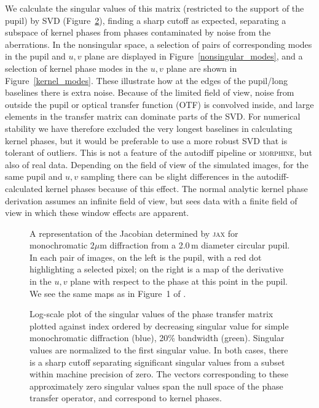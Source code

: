 \documentclass[modern]{aastex63}
\begin{document}
We calculate the singular values of this matrix (restricted to the support of the pupil) by SVD (Figure~\ref{fig:svd}), finding a sharp cutoff as expected, separating a subspace of kernel phases from phases contaminated by noise from the aberrations. In the nonsingular space, a selection of pairs of corresponding modes in the pupil and $u,v$ plane are displayed in Figure~\ref{nonsingular_modes}, and a selection of kernel phase modes in the $u,v$ plane are shown in Figure~\ref{kernel_modes}. These illustrate how at the edges of the pupil/long baselines there is extra noise. Because of the limited field of view, noise from outside the pupil or optical transfer function (OTF) is convolved inside, and large elements in the transfer matrix can dominate parts of the SVD. For numerical stability we have therefore excluded the very longest baselines in calculating kernel phases, but it would be preferable to use a more robust SVD that is tolerant of outliers. This is not a feature of the autodiff pipeline or \textsc{morphine}, but also of real data. Depending on the field of view of the simulated images, for the same pupil and $u,v$ sampling there can be slight differences in the autodiff-calculated kernel phases because of this effect. The normal analytic kernel phase derivation assumes an infinite field of view, but sees data with a finite field of view in which these window effects are apparent. %

\begin{figure}
\caption{A representation of the Jacobian determined by \textsc{jax} for monochromatic 2$\mu$m diffraction from a 2.0\,m diameter circular pupil. In each pair of images, on the left is the pupil, with a red dot highlighting a selected pixel; on the right is a map of the derivative in the $u,v$ plane with respect to the phase at this point in the pupil. We see the same maps as in Figure~1 of \citet{martinache10}. \label{kernel_jacobian}}
\end{figure}

\begin{figure}
     \caption{Log-scale plot of the singular values of the phase transfer matrix plotted against index ordered by decreasing singular value for simple monochromatic diffraction (blue), 20\% bandwidth (green). Singular values are normalized to the first singular value. In both cases, there is a sharp cutoff separating significant singular values from a subset within machine precision of zero. The vectors corresponding to these approximately zero singular values span the null space of the phase transfer operator, and correspond to kernel phases. \href{https://github.com/benjaminpope/morphine/blob/stable/notebooks/morphine_uv.ipynb}{\color{linkcolor}\faGithub}}
    \label{fig:svd}
\end{figure}
\end{document}
